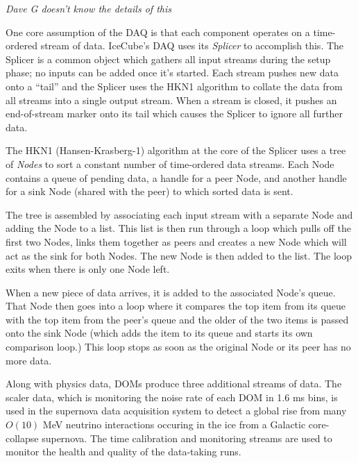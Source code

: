 \textsl{Dave G doesn't know the details of this}

One core assumption of the DAQ is that each component operates on a
time-ordered stream of data.  IceCube's DAQ uses its \emph{Splicer} to
accomplish this.  The Splicer is a common object which gathers all input
streams during the setup phase; no inputs can be added once it's started.  Each
stream pushes new data onto a ``tail'' and the Splicer uses the HKN1 algorithm
to collate the data from all streams into a single output stream.  When a
stream is closed, it pushes an end-of-stream marker onto its tail which causes
the Splicer to ignore all further data.

The HKN1 (Hansen-Krasberg-1) algorithm at the core of the Splicer uses a tree
of \emph{Nodes} to sort a constant number of time-ordered data streams.  Each
Node contains a queue of pending data, a handle for a peer Node, and another
handle for a sink Node (shared with the peer) to which sorted data is sent.

The tree is assembled by associating each input stream with a separate Node
and adding the Node to a list.  This list is then run through a loop which
pulls off the first two Nodes, links them together as peers and creates a
new Node which will act as the sink for both Nodes.  The new Node is then added
to the list.  The loop exits when there is only one Node left.

When a new piece of data arrives, it is added to the associated Node's queue.
That Node then goes into a loop where it compares the top item from its queue
with the top item from the peer's queue and the older of the two items is passed
onto the sink Node (which adds the item to its queue and starts its own
comparison loop.)  This loop stops as soon as the original Node or its peer
has no more data.

Along with physics data, DOMs produce three additional streams of data.
The scaler data, which is monitoring the noise rate of each DOM in 1.6 ms bins,
is used in the supernova data acquisition system \cite{sndaq} to detect a
global rise from many $O(10)$ MeV neutrino interactions occuring in the ice
from a Galactic core-collapse supernova.  The time calibration and monitoring
streams are used to monitor the health and quality of the data-taking runs.

